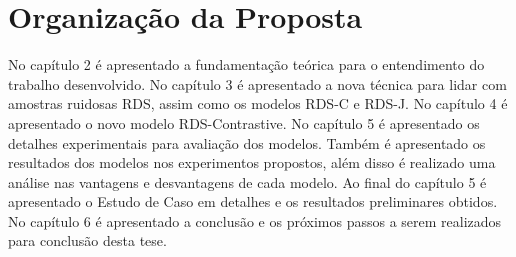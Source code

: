 \section{Organização da Proposta}
No capítulo 2 é apresentado a fundamentação teórica para o entendimento do trabalho desenvolvido. No capítulo 3 é apresentado a nova técnica para lidar com amostras ruidosas RDS, assim como os modelos RDS-C e RDS-J. No capítulo 4 é apresentado o novo modelo RDS-Contrastive. No capítulo 5 é apresentado os detalhes experimentais para avaliação dos modelos. Também é apresentado os resultados dos modelos nos experimentos propostos, além disso é realizado uma análise nas vantagens e desvantagens de cada modelo. Ao final do capítulo 5 é apresentado o Estudo de Caso em detalhes e os resultados preliminares obtidos. No capítulo 6 é apresentado a conclusão e os próximos passos a serem realizados para conclusão desta tese. 











